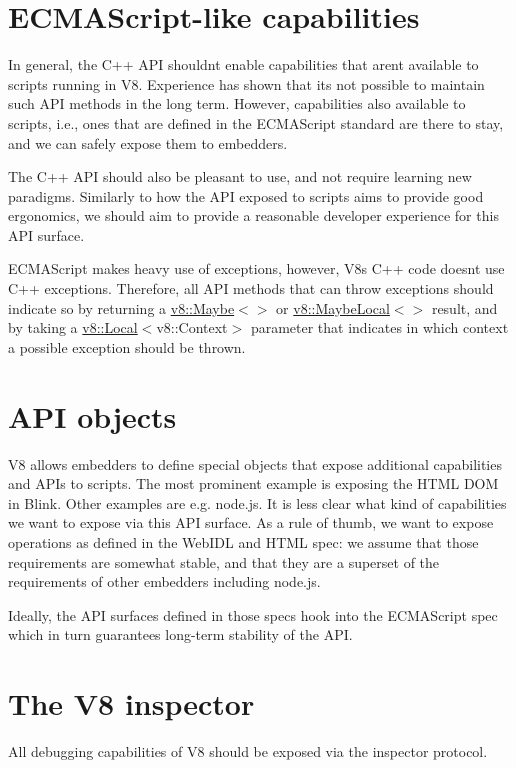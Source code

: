\section*{E\+C\+M\+A\+Script-\/like capabilities}

In general, the C++ A\+PI shouldn\textquotesingle{}t enable capabilities that aren\textquotesingle{}t available to scripts running in V8. Experience has shown that it\textquotesingle{}s not possible to maintain such A\+PI methods in the long term. However, capabilities also available to scripts, i.\+e., ones that are defined in the E\+C\+M\+A\+Script standard are there to stay, and we can safely expose them to embedders.

The C++ A\+PI should also be pleasant to use, and not require learning new paradigms. Similarly to how the A\+PI exposed to scripts aims to provide good ergonomics, we should aim to provide a reasonable developer experience for this A\+PI surface.

E\+C\+M\+A\+Script makes heavy use of exceptions, however, V8\textquotesingle{}s C++ code doesn\textquotesingle{}t use C++ exceptions. Therefore, all A\+PI methods that can throw exceptions should indicate so by returning a \mbox{\hyperlink{classv8_1_1Maybe}{v8\+::\+Maybe}}$<$$>$ or \mbox{\hyperlink{classv8_1_1MaybeLocal}{v8\+::\+Maybe\+Local}}$<$$>$ result, and by taking a \mbox{\hyperlink{classv8_1_1Local}{v8\+::\+Local}}$<$v8\+::\+Context$>$ parameter that indicates in which context a possible exception should be thrown.

\section*{A\+PI objects}

V8 allows embedders to define special objects that expose additional capabilities and A\+P\+Is to scripts. The most prominent example is exposing the H\+T\+ML D\+OM in Blink. Other examples are e.\+g. node.\+js. It is less clear what kind of capabilities we want to expose via this A\+PI surface. As a rule of thumb, we want to expose operations as defined in the Web\+I\+DL and H\+T\+ML spec\+: we assume that those requirements are somewhat stable, and that they are a superset of the requirements of other embedders including node.\+js.

Ideally, the A\+PI surfaces defined in those specs hook into the E\+C\+M\+A\+Script spec which in turn guarantees long-\/term stability of the A\+PI.

\section*{The V8 inspector}

All debugging capabilities of V8 should be exposed via the inspector protocol. 